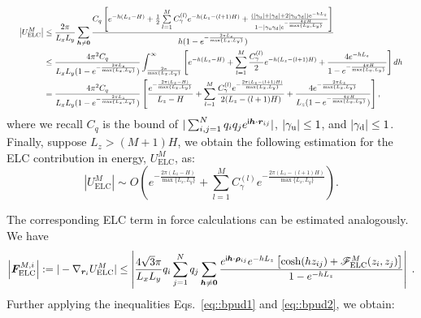 \begin{equation}
\resizebox{.98\hsize}{!}{$
\begin{aligned}
\left|U_{\text{ELC}}^{M}\right|&\leq \frac{2\pi}{L_xL_y}\sum_{\bm{h}\neq \bm{0}} \frac{C_q\left[e^{-h(L_z-H)}+\frac{1}{2}\sum\limits_{l=1}^{M}C^{(l)}_{\gamma}e^{-h(L_z-(l+1)H)}+\frac{(|\gamma_{\T u}|+|\gamma_{\T d}| + 2|\gamma_{\T u}\gamma_{\T d}|)e^{-hL_z}}{1-|\gamma_{\T u}\gamma_{\T d}|e^{-\frac{4\pi H}{\max\{L_x,L_y\}}}}\right]}{h(1-e^{-\frac{2\pi L_z}{\max\{L_x,L_y\}}})}\\
&\leq \frac{4\pi^2 C_q}{L_xL_y(1-e^{-\frac{2\pi L_z}{\max\{L_x,L_y\}}})}\int^{\infty}_{\frac{2\pi}{\max\{L_x,L_y\}}} \left[e^{-h(L_z-H)}+\sum\limits_{l=1}^{M}\frac{C^{(l)}_{\gamma}}{2}e^{-h(L_z-(l+1)H)}+\frac{4e^{-hL_z}}{1-e^{-\frac{4\pi H}{\max\{L_x,L_y\}}}}\right]dh\\
&=\frac{4\pi^2 C_q}{L_xL_y(1-e^{-\frac{2\pi L_z}{\max\{L_x,L_y\}}})}\left[\frac{e^{-\frac{2\pi(L_z-H)}{\max\{L_x,L_y\}}}}{L_z-H}+\sum_{l=1}^{M}\frac{C_{\gamma}^{(l)}e^{-\frac{2\pi(L_z-(l+1)H)}{\max\{L_x,L_y\}}}}{2(L_z-(l+1)H)}+\frac{4e^{-\frac{2\pi L_z}{\max\{L_x,L_y\}}}}{L_z(1-e^{-\frac{4\pi H}{\max\{L_x,L_y\}}})} \right],
\end{aligned}
$}
\end{equation}
where we recall $C_q$ is the bound of $|\sum_{i,j=1}^{N}q_iq_je^{\mathsf i \bm{h}\cdot\bm{r}_{ij}}|$, $\left|\gamma_{\text{u}}\right|\leq 1$, and $\left|\gamma_{\text{d}}\right|\leq 1$. 
Finally, suppose $L_z>(M+1)H$, we obtain the following estimation for the ELC contribution in energy, $U_{\text{ELC}}^{M}$, as:
\begin{equation}
\label{eq::U_ELC}
\left|U_{\text{ELC}}^{M}\right|\sim O\left(e^{-\frac{2\pi(L_z-H)}{\max\{L_x,L_y\}}}+\sum_{l=1}^{M}C_{\gamma}^{(l)}e^{-\frac{2\pi(L_z-(l+1)H)}{\max\{L_x,L_y\}}}\right).
\end{equation}

The corresponding ELC term in force calculations can be estimated analogously. 
We have
\begin{equation}
\left|\bm{F}_{\text{ELC}}^{M,i}\right|:=|-\nabla_{\bm{r}_i} U_{\text{ELC}}^{M}|\leq \left|\frac{4\sqrt{3}\pi}{L_xL_y}q_i\sum_{j=1}^{N}q_j\sum_{\bm{h}\neq \bm{0}} \frac{e^{\mathsf i \bm{h}\cdot\bm{\rho}_{ij}}e^{-hL_z}\left[\cosh(hz_{ij})+\mathscr{F}_{\text{ELC}}^{M}(z_i,z_j)\right]}{1-e^{-hL_z}}\right|\;.
\end{equation}
Further applying the inequalities Eqs.~\eqref{eq::bpud1} and \eqref{eq::bpud2}, we obtain:

